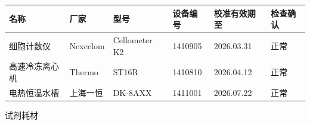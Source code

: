 \documentclass[UTF8,10pt,a4paper,fontset=fandol]{ctexart}
\newcommand{\fieldvalue}[1]{#1}
\newcommand{\handwritten}[1]{#1}
\begin{document}
\begin{center}
\small
\begin{tabularx}{\textwidth}{|X|X|X|X|X|X|}
\hline
名称 & 厂家 & 型号 & 设备编号 & 校准有效期至 & 检查确认\\
\hline
\fieldvalue{细胞计数仪} &
\fieldvalue{Nexcelom} &
\fieldvalue{Cellometer K2} &
\fieldvalue{1410905} &
\fieldvalue{\handwritten{2026.03.31}} &
\fieldvalue{\handwritten{正常}}\\
\hline
\fieldvalue{高速冷冻离心机} &
\fieldvalue{Thermo} &
\fieldvalue{ST16R} &
\fieldvalue{1410810} &
\fieldvalue{\handwritten{2026.04.12}} &
\fieldvalue{\handwritten{正常}}\\
\hline
\fieldvalue{电热恒温水槽} &
\fieldvalue{上海一恒} &
\fieldvalue{DK-8AXX} &
\fieldvalue{1411001} &
\fieldvalue{\handwritten{2026.07.22}} &
\fieldvalue{\handwritten{正常}}\\
\hline
\end{tabularx}
\end{center}

\quad 试剂耗材
\end{document}
